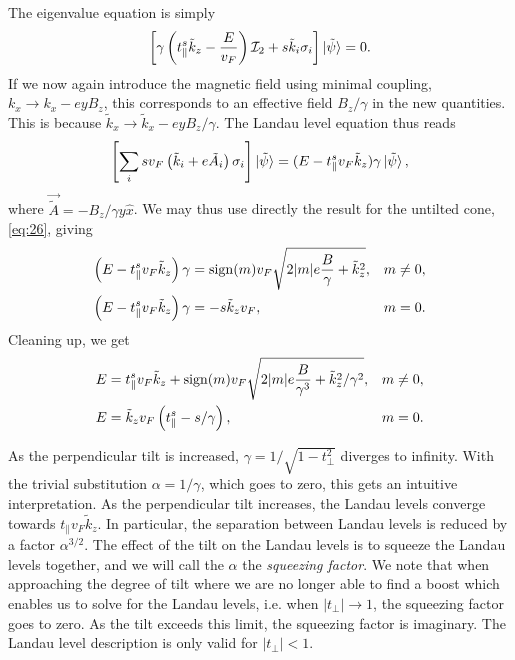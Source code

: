 The eigenvalue equation is simply
\begin{equation}
  \label{eq:42}
  \left[  \gamma \left( t^s_{\parallel} \tilde{k}_{z} - \frac{E}{v_{F}} \right) \mathcal{I}_{2} +
  s \tilde{k}_{i} \sigma _{i} \right] \ket{\tilde{\psi}}= 0.
\end{equation}
If we now again introduce the magnetic field using minimal coupling, \(k_{x} \to  k_{x} - ey B_{z} \), this corresponds to an effective field \(B_{z} /\gamma \) in the new quantities.
This is because \(\tilde{k}_{x} \to  \tilde{k}_{x} - e y B_{z} /\gamma \).
The Landau level equation thus reads
\begin{equation}
  \label{eq:43}
  \left[
  \sum\limits_{i} s v_{F} \left(\tilde{k}_{i} + e \tilde{A}_{i} \right) \sigma _{i}
\right  ] \ket{\tilde{\psi}} =
(E- t^s_{\parallel} v_{F} \tilde{k}_{z}) \gamma \ket{\tilde{\psi}},
\end{equation}
where \(\vec{\tilde{A}}=-B_{z}/ \gamma y \hat{x}\).
We may thus use directly the result for the untilted cone, \cref{eq:26}, giving
\begin{subequations}
  \label{eq:44}
  \begin{align}
    \left(E - t^s_{\parallel} v_{F} \tilde{k}_{z} \right) \gamma &= \operatorname{sign} (m) v_{F} \sqrt{2 |m| e \frac{B}{ \gamma }  + \tilde{k}_{z}^2}, & m \neq 0,\\
    \left(E - t^s_{\parallel} v_{F} \tilde{k}_{z} \right) \gamma &= - s   \tilde{k}_{z} v_{F}, & m=0.
  \end{align}
\end{subequations}
Cleaning up, we get
\begin{subequations}
  \label{eq:45}
  \begin{align}
    E &= t^s_{\parallel} v_F \tilde{k}_{z} + \operatorname{sign}(m) v_F \sqrt{2 |m| e \frac{B}{\gamma ^3}  + \tilde{k}_{z}^2 /\gamma ^2}, & m\neq 0,\\
    E &= \tilde{k}_{z} v_{F} \left( t^s_{\parallel}  - s  / \gamma  \right), & m=0.
  \end{align}
\end{subequations}

As the perpendicular tilt is increased, \(\gamma = 1 / \sqrt{1-t_{\perp} ^{2}}\) diverges to infinity.
With the trivial substitution \(\alpha = 1 /\gamma \), which goes to zero, this gets an intuitive interpretation.
As the perpendicular tilt increases, the Landau levels converge towards \(t_{\parallel} v_{F} \tilde{k}_{z}\).
In particular, the separation between Landau levels is reduced by a factor \(\alpha ^{3 /2}\).
The effect of the tilt on the Landau levels is to squeeze the Landau levels together, and we will call the \(\alpha \) the \emph{squeezing factor}.
We note that when approaching the degree of tilt where we are no longer able to find a boost which enables us to solve for the Landau levels, i.e. when \( |t_{\perp}| \to 1\), the squeezing factor goes to zero.
As the tilt exceeds this limit, the squeezing factor is imaginary.
The Landau level description is only valid for \( |t_{\perp}| < 1 \).

